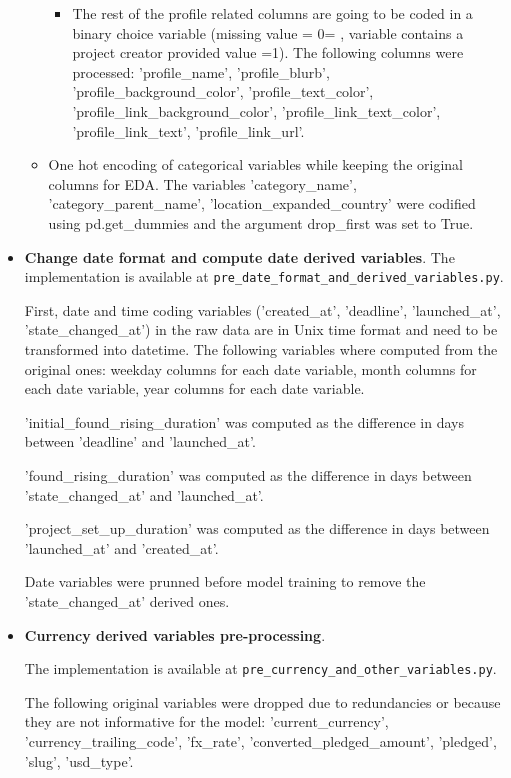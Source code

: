 \documentclass{article}
\begin{document}
\begin{itemize}
\begin{itemize}
\begin{itemize}
            \item The rest of the profile related columns are going to be coded in a binary choice variable (missing value = 0= , variable contains a project creator provided value =1). The following columns were processed: 'profile\_name', 'profile\_blurb', 'profile\_background\_color', 'profile\_text\_color', 'profile\_link\_background\_color', 'profile\_link\_text\_color', 'profile\_link\_text', 'profile\_link\_url'.
        \end{itemize}
	\item One hot encoding of categorical variables while keeping the original columns for EDA.
        The variables 'category\_name', 'category\_parent\_name', 'location\_expanded\_country' were codified using pd.get\_dummies and the argument drop\_first was set to True.
   \end{itemize}
   \item \textbf{Change date format and compute date derived variables}.
    The implementation is available at {\tt pre\_date\_format\_and\_derived\_variables.py}.
    
    First, date and time coding variables ('created\_at', 'deadline', 'launched\_at', 'state\_changed\_at') in the raw data are in Unix time format and need to be transformed into datetime. The following variables where computed from the original ones: weekday columns for each date variable, month columns for each date variable, year columns for each date variable.
    
    'initial\_found\_rising\_duration' was computed as the difference in days between 'deadline' and 'launched\_at'.
    
    'found\_rising\_duration' was computed as the difference in days between 'state\_changed\_at' and 'launched\_at'.
    
    'project\_set\_up\_duration' was computed as the difference in days between 'launched\_at' and 'created\_at'.
    
    Date variables were prunned before model training to remove the 'state\_changed\_at' derived ones.
    
    \item \textbf{Currency derived variables pre-processing}.
    
    The implementation is available at {\tt pre\_currency\_and\_other\_variables.py}.
    
    The following original variables were dropped due to redundancies or because they are not informative for the model: 'current\_currency', 'currency\_trailing\_code', 'fx\_rate', 'converted\_pledged\_amount', 'pledged', 'slug', 'usd\_type'.
    

\end{itemize}
\end{document}
